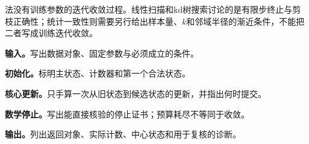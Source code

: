 \label{struct:V2-C02-CH19}
\label{struct:V2-C02-CH20}
\label{struct:V2-C02-CH21}
\label{struct:V2-C02-CH22}
\label{struct:V2-C02-CH23}
\label{struct:V2-C02-CH24}
\label{struct:V2-C02-CH25}
\begin{notapplicablebox}[title=有限步终止与统计一致性]
\kNN{}法没有训练参数的迭代收敛过程。线性扫描和kd树搜索讨论的是有限步终止与剪枝正确性；统计一致性则需要另行给出样本量、$k$和邻域半径的渐近条件，不能把二者写成训练迭代收敛。
\end{notapplicablebox}
\begin{keypointbox}[title={kd树的精确\kNN{}搜索：五步阅读}]
\textbf{输入。}写出数据对象、固定参数与必须成立的条件。\par
\textbf{初始化。}标明主状态、计数器和第一个合法状态。\par
\textbf{核心更新。}只手算一次从旧状态到候选状态的更新，并指出何时提交。\par
\textbf{数学停止。}写出能直接核验的停止证书；预算耗尽不等同于收敛。\par
\textbf{输出。}列出返回对象、实际计数、中心状态和用于复核的诊断。
\end{keypointbox}


